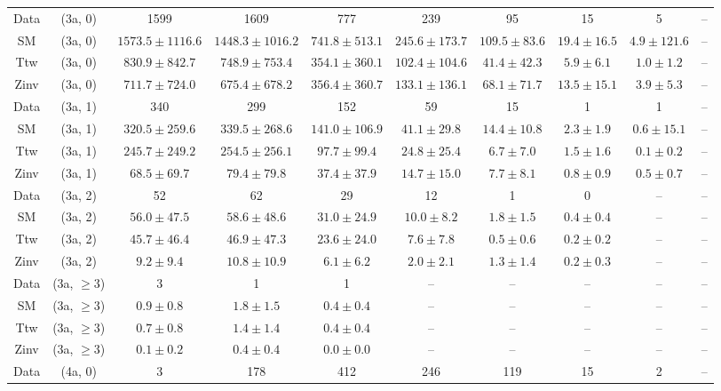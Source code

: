 \begin{table}[h!]
{\begin{tabular}{cccccccccc}
	Data & (3a, 0) & 1599 & 1609 & 777 & 239 & 95 & 15 & 5 & -- \\[0.5ex] 
	SM & (3a, 0) & $1573.5\pm 1116.6$ & $1448.3\pm 1016.2$ & $741.8\pm 513.1$ & $245.6\pm 173.7$ & $109.5\pm 83.6$ & $19.4\pm 16.5$ & $4.9\pm 121.6$ & -- \\[0.5ex] 
	Ttw & (3a, 0) & $830.9\pm 842.7$ & $748.9\pm 753.4$ & $354.1\pm 360.1$ & $102.4\pm 104.6$ & $41.4\pm 42.3$ & $5.9\pm 6.1$ & $1.0\pm 1.2$ & -- \\[0.5ex] 
	Zinv & (3a, 0) & $711.7\pm 724.0$ & $675.4\pm 678.2$ & $356.4\pm 360.7$ & $133.1\pm 136.1$ & $68.1\pm 71.7$ & $13.5\pm 15.1$ & $3.9\pm 5.3$ & -- \\[0.5ex] 
	Data & (3a, 1) & 340 & 299 & 152 & 59 & 15 & 1 & 1 & -- \\[0.5ex] 
	SM & (3a, 1) & $320.5\pm 259.6$ & $339.5\pm 268.6$ & $141.0\pm 106.9$ & $41.1\pm 29.8$ & $14.4\pm 10.8$ & $2.3\pm 1.9$ & $0.6\pm 15.1$ & -- \\[0.5ex] 
	Ttw & (3a, 1) & $245.7\pm 249.2$ & $254.5\pm 256.1$ & $97.7\pm 99.4$ & $24.8\pm 25.4$ & $6.7\pm 7.0$ & $1.5\pm 1.6$ & $0.1\pm 0.2$ & -- \\[0.5ex] 
	Zinv & (3a, 1) & $68.5\pm 69.7$ & $79.4\pm 79.8$ & $37.4\pm 37.9$ & $14.7\pm 15.0$ & $7.7\pm 8.1$ & $0.8\pm 0.9$ & $0.5\pm 0.7$ & -- \\[0.5ex] 
	Data & (3a, 2) & 52 & 62 & 29 & 12 & 1 & 0 & -- & -- \\[0.5ex] 
	SM & (3a, 2) & $56.0\pm 47.5$ & $58.6\pm 48.6$ & $31.0\pm 24.9$ & $10.0\pm 8.2$ & $1.8\pm 1.5$ & $0.4\pm 0.4$ & -- & -- \\[0.5ex] 
	Ttw & (3a, 2) & $45.7\pm 46.4$ & $46.9\pm 47.3$ & $23.6\pm 24.0$ & $7.6\pm 7.8$ & $0.5\pm 0.6$ & $0.2\pm 0.2$ & -- & -- \\[0.5ex] 
	Zinv & (3a, 2) & $9.2\pm 9.4$ & $10.8\pm 10.9$ & $6.1\pm 6.2$ & $2.0\pm 2.1$ & $1.3\pm 1.4$ & $0.2\pm 0.3$ & -- & -- \\[0.5ex] 
	Data & (3a, $\ge3$) & 3 & 1 & 1 & -- & -- & -- & -- & -- \\[0.5ex] 
	SM & (3a, $\ge3$) & $0.9\pm 0.8$ & $1.8\pm 1.5$ & $0.4\pm 0.4$ & -- & -- & -- & -- & -- \\[0.5ex] 
	Ttw & (3a, $\ge3$) & $0.7\pm 0.8$ & $1.4\pm 1.4$ & $0.4\pm 0.4$ & -- & -- & -- & -- & -- \\[0.5ex] 
	Zinv & (3a, $\ge3$) & $0.1\pm 0.2$ & $0.4\pm 0.4$ & $0.0\pm 0.0$ & -- & -- & -- & -- & -- \\[0.5ex] 
	Data & (4a, 0) & 3 & 178 & 412 & 246 & 119 & 15 & 2 & -- \\[0.5ex] 

\end{tabular}}
\end{table}
